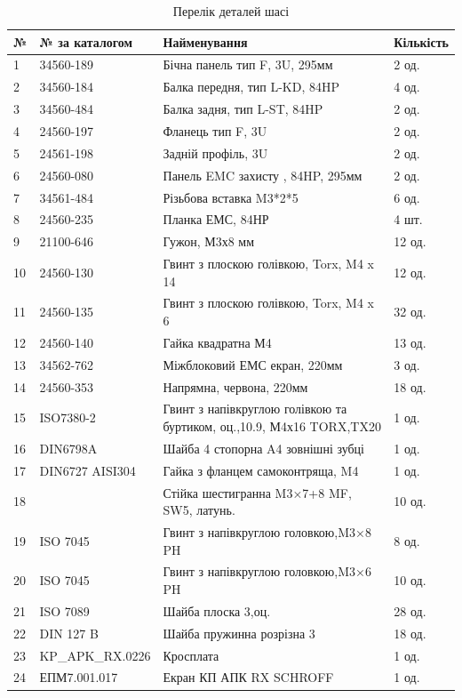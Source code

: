 \begin{table}[H]
    \centering
  \caption{Перелік деталей шасі}
    \begin{tabular}{|p{0.8cm}|p{3.2cm}|p{7.5cm}|p{2cm}|} 
        \hline
        \textbf{№} & \textbf{№ за каталогом} & \textbf{Найменування} & \textbf{Кількість} \\ \hline
        1 & 34560-189 & Бічна панель тип F, 3U, 295мм  & 2 од. \\ \hline
        2 & 34560-184 & Балка передня, тип L-KD, 84HP & 4 од. \\ \hline
        3 & 34560-484 & Балка задня, тип L-ST, 84HP & 2 од. \\ \hline
        4 & 24560-197 & Фланець тип F, 3U & 2 од. \\ \hline
        5 & 24561-198 & Задній профіль, 3U & 2 од. \\ \hline
        6 & 24560-080 & Панель EMC захисту , 84HP, 295мм & 2 од. \\ \hline
        7 & 34561-484 & Різьбова вставка M3*2*5 & 6 од. \\ \hline
        8 & 24560-235 & Планка ЕМС, 84НР & 4 шт. \\ \hline
        9 & 21100-646 & Гужон, М3х8 мм & 12 од. \\ \hline
       10 & 24560-130 & Гвинт з плоскою голівкою, Torx, M4 x 14 & 12 од. \\ \hline
       11 & 24560-135 & Гвинт з плоскою голівкою, Torx, M4 x 6 & 32 од. \\ \hline
       12 & 24560-140 & Гайка квадратна М4 & 13 од. \\ \hline
       13 & 34562-762 & Міжблоковий ЕМС екран, 220мм & 3 од. \\ \hline
       14 & 24560-353 & Напрямна, червона, 220мм & 18 од. \\ \hline
       15 & ISO7380-2 & Гвинт з напівкруглою голівкою та буртиком, оц.,10.9, М4х16 TORX,TX20 & 1 од. \\ \hline
       16 & DIN6798A & Шайба 4 стопорна A4 зовнішні зубці & 1 од. \\ \hline
       17 & DIN6727 AISI304 & Гайка з фланцем самоконтряща, M4 & 1 од. \\ \hline
       18 &  & Стійка шестигранна M3×7+8 MF, SW5, латунь. & 10 од. \\ \hline
       19 & ISO 7045 & Гвинт з напівкруглою головкою,M3×8 PH & 8 од. \\ \hline
       20 & ISO 7045 & Гвинт з напівкруглою головкою,M3×6 PH & 10 од. \\ \hline
       21 & ISO 7089 & Шайба плоска 3,оц. & 28 од. \\ \hline
       22 & DIN 127 B & Шайба пружинна розрізна 3 & 18 од. \\ \hline
       23 & KP_APK_RX.0226 & Кросплата & 1 од. \\ \hline
       24 & ЕПМ7.001.017 & Екран КП АПК RX SCHROFF & 1 од. \\ \hline
   
    \end{tabular}
    
\end{table}

